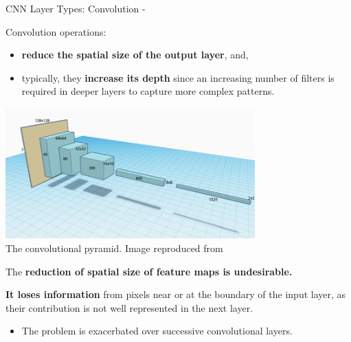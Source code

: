 \begin{frame}[t,allowframebreaks]{CNN Layer Types: Convolution -}
    \framebreak

    Convolution operations: 
    \begin{itemize}
        \item 
        {\bf reduce the spatial size of the output layer}, and,
        \item 
        typically, they {\bf increase its depth} 
        since an increasing number of filters is required 
        in deeper layers to capture more complex patterns.\\
    \end{itemize}

    \begin{center}
        \includegraphics[width=0.72\textwidth]
            {./images/cnn/convolution/hui17_convolutional_pyramid_1.png}\\
        {\scriptsize
            The convolutional pyramid. 
            \color{col:attribution} 
            Image reproduced from \cite{HuiBlog:CNNTutorial}}\\    
    \end{center}

    \framebreak

    The {\bf reduction of spatial size of 
    \glspl{feature map} is undesirable.}\\
    \vspace{0.2cm}
    
    {\bf It loses information} from pixels near or at the boundary 
    of the input layer, as their contribution is not well represented in the next layer.
    \begin{itemize}
        \item The problem is exacerbated over successive convolutional layers.\\
    \end{itemize}
    \vspace{0.2cm}


\end{frame}
